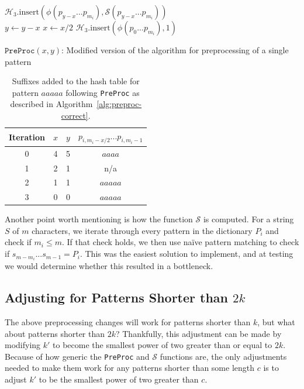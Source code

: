 \documentclass[ %
                    author={Dominic Joseph Moylett},
                    degree={MEng},
                     title={Dictionary Matching with Fingerprints},
                  subtitle={An Empirical Analysis},
                      type={research},
                      year={2015} ]{dissertation}
\begin{document}
\begin{algorithm}[t]
 {
   {
    $\mathcal{H}_3.\text{insert}(\phi(p_{y-x}...p_{m_i}), \mathcal{S}(p_{y-x}...p_{m_i}))$\\
    $y \gets y - x$
  }
  $x \gets x/2$
}
$\mathcal{H}_3.\text{insert}(\phi(p_0...p_{m_i}), 1)$
\caption{$\texttt{PreProc}(x,y)$: Modified version of the algorithm for preprocessing of a single pattern}
\label{alg:preproc-correct}
\end{algorithm}

\begin{table}[t]
  \centering
  \begin{tabular}{|c|c|c|c|}
    \hline
    Iteration & $x$ & $y$ & $p_{i, m_i-x/2}...p_{i, m_i - 1}$ \\\hline
    0 & 4 & 5 & $aaaa$ \\\hline
    1 & 2 & 1 & n/a \\\hline
    2 & 1 & 1 & $aaaaa$ \\\hline
    3 & 0 & 0 & $aaaaa$ \\\hline
  \end{tabular}
  \caption{Suffixes added to the hash table for pattern $aaaaa$ following \texttt{PreProc} as described in Algorithm~\ref{alg:preproc-correct}.}
  \label{tab:preproc-results-correct}
\end{table}

Another point worth mentioning is how the function $\mathcal{S}$ is computed. For a string $S$ of $m$ characters, we iterate through every pattern in the dictionary $P_i$ and check if $m_i \leq m$. If that check holds, we then use na\"{i}ve pattern matching to check if $s_{m - m_i}...s_{m - 1} = P_i$. This was the easiest solution to implement, and at testing we would determine whether this resulted in a bottleneck.

\subsection{Adjusting for Patterns Shorter than $2k$}

The above preprocessing changes will work for patterns shorter than $k$, but what about patterns shorter than $2k$? Thankfully, this adjustment can be made by modifying $k'$ to become the smallest power of two greater than or equal to $2k$. Because of how generic the \texttt{PreProc} and $\mathcal{S}$ functions are, the only adjustments needed to make them work for any patterns shorter than some length $c$ is to adjust $k'$ to be the smallest power of two greater than $c$.
\end{document}
